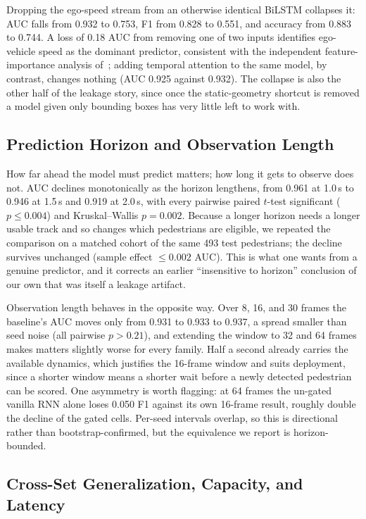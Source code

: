 \documentclass[mti,article,submit,moreauthors]{Definitions/mdpi}
\begin{document}
Dropping the ego-speed stream from an otherwise identical BiLSTM collapses it: AUC falls from 0.932 to 0.753, F1 from 0.828 to 0.551, and accuracy from 0.883 to 0.744. A loss of 0.18 AUC from removing one of two inputs identifies ego-vehicle speed as the dominant predictor, consistent with the independent feature-importance analysis of~\citet{azarmi2024featureimportance}; adding temporal attention to the same model, by contrast, changes nothing (AUC 0.925 against 0.932). The collapse is also the other half of the leakage story, since once the static-geometry shortcut is removed a model given only bounding boxes has very little left to work with.

\subsection{Prediction Horizon and Observation Length}
\label{sec:horizon}

How far ahead the model must predict matters; how long it gets to observe does not. AUC declines monotonically as the horizon lengthens, from 0.961 at 1.0\,s to 0.946 at 1.5\,s and 0.919 at 2.0\,s, with every pairwise paired $t$-test significant ($p \le 0.004$) and Kruskal--Wallis $p = 0.002$. Because a longer horizon needs a longer usable track and so changes which pedestrians are eligible, we repeated the comparison on a matched cohort of the same 493 test pedestrians; the decline survives unchanged (sample effect $\le 0.002$ AUC). This is what one wants from a genuine predictor, and it corrects an earlier ``insensitive to horizon'' conclusion of our own that was itself a leakage artifact.

Observation length behaves in the opposite way. Over 8, 16, and 30 frames the baseline's AUC moves only from 0.931 to 0.933 to 0.937, a spread smaller than seed noise (all pairwise $p > 0.21$), and extending the window to 32 and 64 frames makes matters slightly worse for every family. Half a second already carries the available dynamics, which justifies the 16-frame window and suits deployment, since a shorter window means a shorter wait before a newly detected pedestrian can be scored. One asymmetry is worth flagging: at 64 frames the un-gated vanilla RNN alone loses 0.050 F1 against its own 16-frame result, roughly double the decline of the gated cells. Per-seed intervals overlap, so this is directional rather than bootstrap-confirmed, but the equivalence we report is horizon-bounded.


\subsection{Cross-Set Generalization, Capacity, and Latency}
\label{sec:loso}
\end{document}
